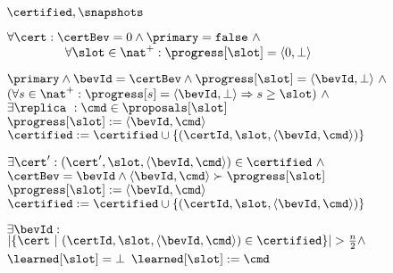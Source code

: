 \begin{figure}[t]
\begin{center}

 \begin{algorithm}[H]

\caption{\label{alg:bevs} \multiconsensus}
\footnotesize{
\begin{distribalgo}[0]

\BLANK

\INDENT{\var ~ $\certBev, \primary, \progress[1...]$}
   \STATE $\certified, \snapshots$
\ENDINDENT

\BLANK

\INDENT{\init: $\certified = \snapshots = \emptyset ~\land$}
	\STATE $\forall \cert: \certBev = 0 \land \primary = \texttt{false} ~\land$
	\STATE $~~~~~~~~~~~~~~\forall \slot \in \nat^{+}: \progress[\slot] = \langle 0, \bot \rangle$
\ENDINDENT

\BLANK
\BLANK

\INDENT{\precond:}
  \STATE $\primary \land \bevId = \certBev \land \progress[\slot] = \langle \bevId, \bot \rangle ~\land$
\STATE $(\forall s \in \nat^+: \progress[s] = \langle \bevId, \bot \rangle \Rightarrow s \ge \slot) ~\land$
  \STATE $\exists \replica\ : \cmd \in \proposals[\slot]$
\ENDINDENT
\INDENT{\action:}
  \STATE $\progress[\slot] := \langle \bevId, \cmd \rangle$
  \STATE $\certified := \certified \cup \lbrace (\certId, \slot, \langle \bevId, \cmd\rangle) \rbrace$
\ENDINDENT
\ENDINDENT

\BLANK

\INDENT{\precond:}
  \STATE $\exists \cert': (\cert', \slot, \langle \bevId, \cmd \rangle) \in \certified ~\land$
  \STATE $\certBev = \bevId \land \langle \bevId, \cmd \rangle \succ \progress[\slot]$
\ENDINDENT
\INDENT{\action:}
  \STATE $\progress[\slot] := \langle \bevId, \cmd \rangle$
  \STATE $\certified := \certified \cup \lbrace (\certId, \slot, \langle \bevId, \cmd\rangle) \rbrace$
\ENDINDENT
\ENDINDENT



\BLANK

\INDENT{\outtransition\ $\texttt{\observedecision}(\replica, \slot, \cmd)$:}
\INDENT{\precond:}
  \STATE $\exists \bevId:$\\
       \hspace{0.05in} $ | \lbrace \cert ~|~ (\certId, \slot, \langle \bevId, \cmd \rangle) \in \certified \rbrace |  > \frac{n}{2} \land$
  \STATE $\learned[\slot] = \bot$
\ENDINDENT
\INDENT{\action:}
  \STATE $\learned[\slot] := \cmd$
\ENDINDENT
\ENDINDENT


\end{distribalgo}}
\end{algorithm}
\end{center}
\end{figure}

